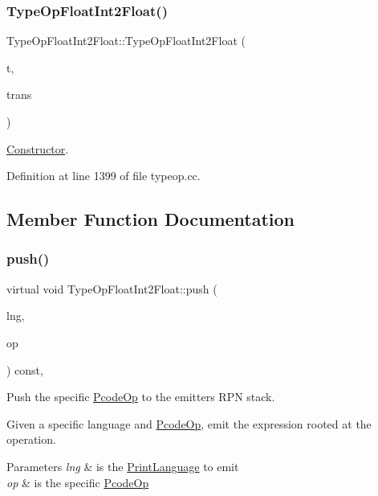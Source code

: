 \subsubsection{\texorpdfstring{TypeOpFloatInt2Float()}{TypeOpFloatInt2Float()}}
{\footnotesize\ttfamily Type\+Op\+Float\+Int2\+Float\+::\+Type\+Op\+Float\+Int2\+Float (\begin{DoxyParamCaption}\item[{\mbox{\hyperlink{class_type_factory}{Type\+Factory}} $\ast$}]{t,  }\item[{const \mbox{\hyperlink{class_translate}{Translate}} $\ast$}]{trans }\end{DoxyParamCaption})}



\mbox{\hyperlink{class_constructor}{Constructor}}. 



Definition at line 1399 of file typeop.\+cc.



\subsection{Member Function Documentation}
\mbox{\label{class_type_op_float_int2_float_a24a3d658921d5cd83e2f4233c38bb14f}} 
\subsubsection{\texorpdfstring{push()}{push()}}
{\footnotesize\ttfamily virtual void Type\+Op\+Float\+Int2\+Float\+::push (\begin{DoxyParamCaption}\item[{\mbox{\hyperlink{class_print_language}{Print\+Language}} $\ast$}]{lng,  }\item[{const \mbox{\hyperlink{class_pcode_op}{Pcode\+Op}} $\ast$}]{op }\end{DoxyParamCaption}) const\hspace{0.3cm}{\ttfamily [inline]}, {\ttfamily [virtual]}}



Push the specific \mbox{\hyperlink{class_pcode_op}{Pcode\+Op}} to the emitter\textquotesingle{}s R\+PN stack. 

Given a specific language and \mbox{\hyperlink{class_pcode_op}{Pcode\+Op}}, emit the expression rooted at the operation. 
\begin{DoxyParams}{Parameters}
{\em lng} & is the \mbox{\hyperlink{class_print_language}{Print\+Language}} to emit \\
\hline
{\em op} & is the specific \mbox{\hyperlink{class_pcode_op}{Pcode\+Op}} \\
\hline
\end{DoxyParams}


